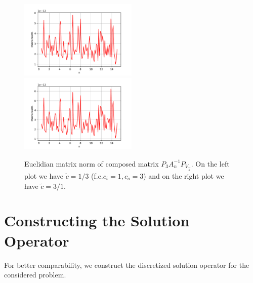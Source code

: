 \documentclass[10pt,journal,compsoc, onecolumn]{IEEEtran}
\begin{document}
\begin{figure}
    \includegraphics[width=0.5\textwidth]{scenario1PVal.pdf}
    \includegraphics[width=0.5\textwidth]{scenario2PVal.pdf}
    \caption{Euclidian matrix norm of composed matrix  $P_3A_n^{-1}P_{V_{\vec{b}}}$. 
     On the left plot we have $\tilde c = 1/3$ (f.e.$c_i = 1, c_o = 3$)
    and on the right plot we have $\tilde c = 3/1$.
    }
   \label{fig:p_validation}
\end{figure}

\section{Constructing the Solution Operator}
For better comparability, we construct the discretized solution operator for the considered problem.
\end{document}
